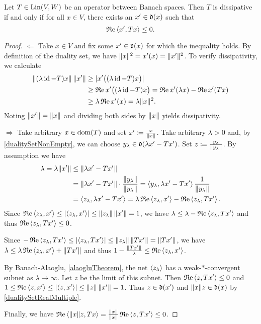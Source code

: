 \begin{proposition} \label{dissipativeNegativeRealPart}
Let $T\in\operatorname{Lin}(V,W)$ be an operator between Banach spaces. Then $T$ is dissipative \textup{if and only if} for all $x\in V$, there exists an $x'\in \operatorname{\mathfrak{d}}(x)$ such that
\[ \operatorname{\mathfrak{R}e}\left\langle x', Tx \right\rangle \leq 0. \]
\end{proposition}
\begin{proof}
$\boxed{\Leftarrow}$ Take $x\in V$ and fix some $x'\in \operatorname{\mathfrak{d}}(x)$ for which the inequality holds. By definition of the duality set, we have $\lVert x\rVert^2 = x'(x) = \lVert x'\rVert^2$. To verify dissipativity, we calculate
\begin{align*}
\lVert(\lambda\operatorname{id}-T)x\rVert\,\lVert x'\rVert &\geq |x'\big((\lambda\operatorname{id}-T)x\big)| \\
&\geq \operatorname{\mathfrak{R}e} x'\big((\lambda\operatorname{id}-T)x\big) = \operatorname{\mathfrak{R}e} x'(\lambda x) - \operatorname{\mathfrak{R}e} x'(Tx) \\
&\geq \lambda \operatorname{\mathfrak{R}e} x'(x) = \lambda \lVert x\rVert^2.
\end{align*}
Noting $\lVert x'\rVert = \lVert x\rVert$ and dividing both sides by $\lVert x\rVert$ yields dissipativity.

$\boxed{\Rightarrow}$ Take arbitrary $x\in \operatorname{dom}(T)$ and set $x'\coloneqq \frac{x}{\lVert x\rVert}$. Take arbitrary $\lambda >0$ and, by \ref{dualitySetNonEmpty}, we can choose $y_\lambda \in \operatorname{\mathfrak{d}}(\lambda x'-Tx')$. Set $z\coloneqq \frac{y_\lambda}{\lVert y_\lambda\rVert}$. By assumption we have
\begin{align*}
\lambda = \lambda\lVert x'\rVert &\leq \lVert\lambda x' - Tx'\rVert \\
&= \lVert\lambda x' - Tx'\rVert\cdot \frac{\lVert y_\lambda\rVert}{\lVert y_\lambda\rVert} = \left\langle y_\lambda, \lambda x' - Tx' \right\rangle\frac{1}{\lVert y_\lambda\rVert} \\
&= \left\langle z_\lambda, \lambda x' - Tx' \right\rangle = \lambda\operatorname{\mathfrak{R}e}\left\langle z_\lambda, x' \right\rangle - \operatorname{\mathfrak{R}e}\left\langle z_\lambda, Tx' \right\rangle.
\end{align*}
Since $\operatorname{\mathfrak{R}e}\left\langle z_\lambda, x' \right\rangle \leq \left|\left\langle z_\lambda, x' \right\rangle\right| \leq \lVert z_\lambda\rVert\,\lVert x'\rVert = 1$, we have $\lambda \leq \lambda - \operatorname{\mathfrak{R}e}\left\langle z_\lambda, Tx' \right\rangle$ and thus $\operatorname{\mathfrak{R}e}\left\langle z_\lambda, Tx' \right\rangle \leq 0$.

Since $-\operatorname{\mathfrak{R}e}\left\langle z_\lambda, Tx' \right\rangle \leq \left|\left\langle z_\lambda, Tx' \right\rangle\right| \leq \lVert z_\lambda\rVert\,\lVert Tx'\rVert = \lVert Tx'\rVert$, we have $\lambda \leq \lambda \operatorname{\mathfrak{R}e}\left\langle z_\lambda, x' \right\rangle + \lVert Tx'\rVert$ and thus $1 - \frac{\lVert Tx'\rVert}{\lambda} \leq \operatorname{\mathfrak{R}e}\left\langle z_\lambda, x' \right\rangle$.

By Banach-Alaoglu, \ref{alaogluTheorem}, the net $\left\langle z_\lambda \right\rangle$ has a weak-$*$-convergent subnet as $\lambda\to\infty$. Let $z$ be the limit of this subnet. Then $\operatorname{\mathfrak{R}e}\left\langle z,Tx' \right\rangle\leq 0$ and $1\leq \operatorname{\mathfrak{R}e}\left\langle z,x' \right\rangle\leq \left|\left\langle z, x' \right\rangle\right| \leq \lVert z\rVert\, \lVert x'\rVert = 1$. Thus $z\in\operatorname{\mathfrak{d}}(x')$ and $\lVert x\rVert z \in \operatorname{\mathfrak{d}}(x)$ by \ref{dualitySetRealMultiple}.

Finally, we have $\operatorname{\mathfrak{R}e}\left\langle \lVert x\rVert z, Tx \right\rangle = \frac{\lVert x\rVert}{\lVert x\rVert}\operatorname{\mathfrak{R}e}\left\langle z, Tx' \right\rangle \leq 0$.
\end{proof}

